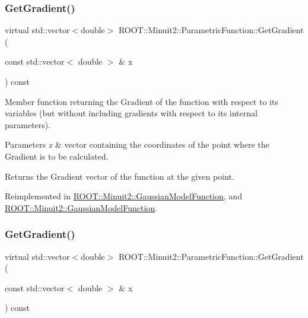 \subsubsection{\texorpdfstring{GetGradient()}{GetGradient()}\hspace{0.1cm}{\footnotesize\ttfamily [2/3]}}
{\footnotesize\ttfamily virtual std\+::vector$<$double$>$ R\+O\+O\+T\+::\+Minuit2\+::\+Parametric\+Function\+::\+Get\+Gradient (\begin{DoxyParamCaption}\item[{const std\+::vector$<$ double $>$ \&}]{x }\end{DoxyParamCaption}) const\hspace{0.3cm}{\ttfamily [virtual]}}

Member function returning the Gradient of the function with respect to its variables (but without including gradients with respect to its internal parameters).


\begin{DoxyParams}{Parameters}
{\em x} & vector containing the coordinates of the point where the Gradient is to be calculated.\\
\hline
\end{DoxyParams}
\begin{DoxyReturn}{Returns}
the Gradient vector of the function at the given point. 
\end{DoxyReturn}


Reimplemented in \mbox{\hyperlink{classROOT_1_1Minuit2_1_1GaussianModelFunction_ac81a3c5531a291b8a9c3af533de07195}{R\+O\+O\+T\+::\+Minuit2\+::\+Gaussian\+Model\+Function}}, and \mbox{\hyperlink{classROOT_1_1Minuit2_1_1GaussianModelFunction_ac81a3c5531a291b8a9c3af533de07195}{R\+O\+O\+T\+::\+Minuit2\+::\+Gaussian\+Model\+Function}}.

\mbox{\label{classROOT_1_1Minuit2_1_1ParametricFunction_a209b13474fae14c1e4a5523c6850c7ed}} 
\subsubsection{\texorpdfstring{GetGradient()}{GetGradient()}\hspace{0.1cm}{\footnotesize\ttfamily [3/3]}}
{\footnotesize\ttfamily virtual std\+::vector$<$double$>$ R\+O\+O\+T\+::\+Minuit2\+::\+Parametric\+Function\+::\+Get\+Gradient (\begin{DoxyParamCaption}\item[{const std\+::vector$<$ double $>$ \&}]{x }\end{DoxyParamCaption}) const\hspace{0.3cm}{\ttfamily [virtual]}}


